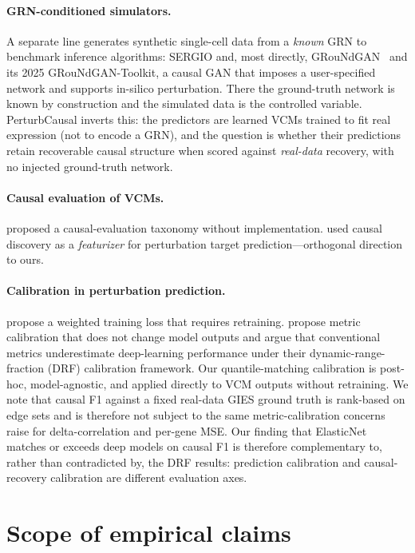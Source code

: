 \documentclass{article}
\theoremstyle{plain}
\theoremstyle{definition}
\theoremstyle{remark}
\begin{document}
\paragraph{GRN-conditioned simulators.} A separate line generates synthetic single-cell data from a \emph{known} GRN to benchmark inference algorithms: SERGIO and, most directly, GRouNdGAN~\citep{zinati2024groundgan} and its 2025 GRouNdGAN-Toolkit, a causal GAN that imposes a user-specified network and supports in-silico perturbation. There the ground-truth network is known by construction and the simulated data is the controlled variable. PerturbCausal inverts this: the predictors are learned VCMs trained to fit real expression (not to encode a GRN), and the question is whether their predictions retain recoverable causal structure when scored against \emph{real-data} recovery, with no injected ground-truth network.

\paragraph{Causal evaluation of VCMs.} \citet{vc_causal_2025} proposed a causal-evaluation taxonomy without implementation. \citet{wu2025cdn} used causal discovery as a \emph{featurizer} for perturbation target prediction---orthogonal direction to ours.

\paragraph{Calibration in perturbation prediction.} \citet{mejia2025diversity} propose a weighted training loss that requires retraining. \citet{miller2025calibrated} propose metric calibration that does not change model outputs and argue that conventional metrics underestimate deep-learning performance under their dynamic-range-fraction (DRF) calibration framework. Our quantile-matching calibration is post-hoc, model-agnostic, and applied directly to VCM outputs without retraining. We note that causal F1 against a fixed real-data GIES ground truth is rank-based on edge sets and is therefore not subject to the same metric-calibration concerns \citet{miller2025calibrated} raise for delta-correlation and per-gene MSE. Our finding that ElasticNet matches or exceeds deep models on causal F1 is therefore complementary to, rather than contradicted by, the DRF results: prediction calibration and causal-recovery calibration are different evaluation axes.

\section{Scope of empirical claims}
\label{app:scope}
\end{document}
